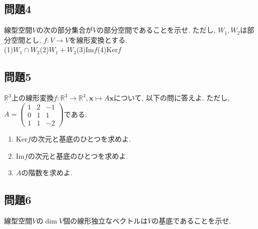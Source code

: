 \documentclass[a4j,dvipdfmx]{jsarticle}
\begin{document}
    \subsection*{問題4}
        線型空間$V$の次の部分集合が$V$の部分空間であることを示せ. ただし, $W_1,W_2$は部分空間とし, $f:V\to V$を線形変換とする.\\
        (1)$W_1\cap W_2$\quad (2)$W_1+W_2$\quad (3)$\mathrm{Im}f$\quad (4)$\mathrm{Ker}f$
    \subsection*{問題5}
        $\mathbb{R}^3$上の線形変換$f:\mathbb{R}^3\to\mathbb{R}^3,\bm{x}\mapsto A\bm{x}$について, 以下の問に答えよ. ただし, $A=\begin{pmatrix}1 & 2 & -1\\0 & 1 & 1\\ 1 & 1 & -2\end{pmatrix}$である.
        \begin{enumerate}
            \item $\mathrm{Ker}f$の次元と基底のひとつを求めよ.
            \item $\mathrm{Im} f$の次元と基底のひとつを求めよ.
            \item $A$の階数を求めよ.
        \end{enumerate}
    \subsection*{問題6}
        線型空間$V$の$\dim V$個の線形独立なベクトルは$V$の基底であることを示せ.
\end{document}
